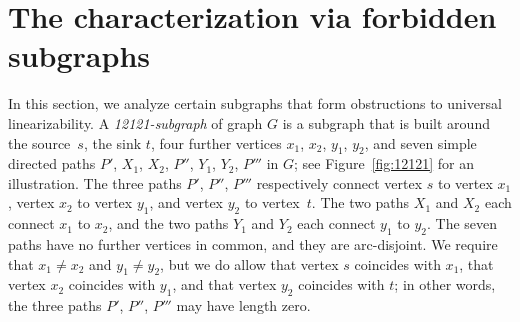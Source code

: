 \documentclass[11pt,fleqn]{article}
\begin{document}
\medskip
\section{The characterization via forbidden subgraphs}
\label{sec:forbidden}
In this section, we analyze certain subgraphs that form obstructions to universal linearizability.
A \emph{12121-subgraph} of graph $G$ is a subgraph that is built around the source~$s$, the sink $t$, 
four further vertices $x_1$, $x_2$, $y_1$, $y_2$, and seven simple directed paths $P'$, $X_1$, 
$X_2$, $P''$, $Y_1$, $Y_2$, $P'''$ in $G$; see Figure~\ref{fig:12121} for an illustration.
The three paths $P'$, $P''$, $P'''$ respectively connect vertex $s$ to vertex $x_1$,
vertex $x_2$ to vertex $y_1$, and vertex $y_2$ to vertex~$t$.
The two paths $X_1$ and $X_2$ each connect $x_1$ to $x_2$, and
the two paths $Y_1$ and $Y_2$ each connect $y_1$ to $y_2$.
The seven paths have no further vertices in common, and they are arc-disjoint.
We require that $x_1\ne x_2$ and $y_1\ne y_2$, but we do allow that vertex $s$ coincides with $x_1$, 
that vertex $x_2$ coincides with $y_1$, and that vertex $y_2$ coincides with $t$; 
in other words, the three paths $P'$, $P''$, $P'''$ may have length zero.
\end{document}
